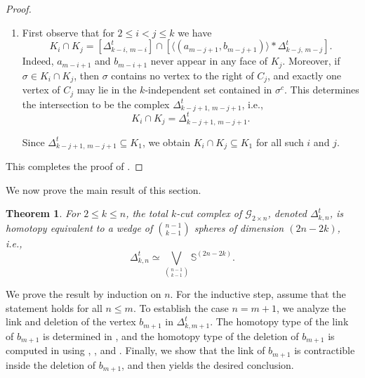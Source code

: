 \documentclass[11pt,reqno,a4paper]{amsart}
\newtheorem{theorem}{Theorem}[section]
\theoremstyle{definition}
\theoremstyle{theorem}
\newcommand{\twogg}{\mathcal{G}_{2\times n}}
\newcommand{\lno}{\left(}
\newcommand{\rno}{\right)}
\newcommand{\lsq}{\left[}
\newcommand{\rsq}{\right]}
\newcommand{\bbS}{\mathbb{S}}
\theoremstyle{remark}
\begin{document}
\begin{proof}
\begin{enumerate}
    \item First observe that for $2 \le i < j \le k$ we have
\[
K_i \cap K_j 
  = \lsq \Delta_{k-i,\,m-i}^t \rsq 
    \cap 
    \lsq \langle \lno a_{m-j+1}, b_{m-j+1} \rno \rangle * \Delta_{k-j,\,m-j}^t \rsq.
\]
Indeed, $a_{m-i+1}$ and $b_{m-i+1}$ never appear in any face of $K_j$. 
Moreover, if $\sigma \in K_i \cap K_j$, then $\sigma$ contains no vertex to the right of $C_j$, and exactly one vertex of $C_j$ may lie in the $k$-independent set contained in $\sigma^c$. 
This determines the intersection to be the complex $\Delta_{k-j+1,\,m-j+1}^t$, i.e.,
\[
K_i \cap K_j = \Delta_{k-j+1,\,m-j+1}^t.
\]

Since $\Delta_{k-j+1,\,m-j+1}^t \subseteq K_1$, we obtain $K_i \cap K_j \subseteq K_1$ for all such $i$ and $j$.
\end{enumerate}

This completes the proof of .

\end{proof}

 

    We now prove the main result of this section.

\begin{theorem}\label{thm: homotopy type of total k-cut complex of 2n-gg}
    For $2 \le k \le n$, the total $k$-cut complex of $\twogg$, denoted $\Delta_{k,n}^t$, is homotopy equivalent to a wedge of $\binom{n-1}{k-1}$ spheres of dimension $\lno 2n-2k\rno$, i.e.,
    \[
        \Delta_{k,n}^t \simeq \bigvee_{\binom{n-1}{k-1}} \bbS^{\lno 2n-2k\rno}.
    \]
\end{theorem}

We prove the result by induction on $n$. 
For the inductive step, assume that the statement holds for all $n \le m$. 
To establish the case $n = m+1$, we analyze the link and deletion of the vertex $b_{m+1}$ in $\Delta_{k,m+1}^t$. 
The homotopy type of the link of $b_{m+1}$ is determined in , and the homotopy type of the deletion of $b_{m+1}$ is computed in  using , 
, 
and . 
Finally, we show that the link of $b_{m+1}$ is contractible inside the deletion of $b_{m+1}$, and  then yields the desired conclusion.
\end{document}

